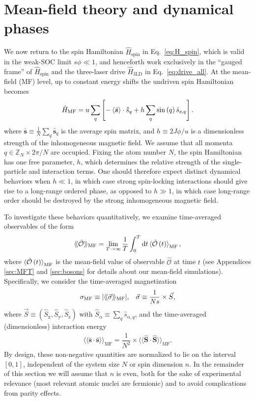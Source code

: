 \documentclass[aps,pra,nofootinbib,twocolumn,superscriptaddress]{revtex4-2}
\renewcommand{\t}{\text} %
\newcommand{\f}[2]{\dfrac{#1}{#2}} %
\newcommand{\p}[1]{\left(#1\right)} %
\renewcommand{\sp}[1]{\left[#1\right]} %
\newcommand{\bk}{\braket} %
\renewcommand{\v}{\bm} %
\renewcommand{\dd}{\text{d}} %
\newcommand{\bbk}[1]{\langle\!\langle #1 \rangle\!\rangle}
\newcommand{\1}{\mathds{1}}
\newcommand{\s}{\hat s}
\renewcommand{\H}{\hat H}
\renewcommand{\S}{\hat S}
\renewcommand{\O}{\hat{\mathcal{O}}}
\newcommand{\x}{\text{x}}
\newcommand{\y}{\text{y}}
\newcommand{\z}{\text{z}}
\newcommand{\ZZ}{\mathbb{Z}}
\newcommand{\spin}{\text{spin}}
\newcommand{\MF}{\text{MF}}
\renewcommand{\ss}{\bar{\v s}\cdot\bar{\v s}}
\begin{document}
\section{Mean-field theory and dynamical phases}
\label{sec:mean_field}

We now return to the spin Hamiltonian $\H_\spin$ in Eq.~\eqref{eq:H_spin}, which is valid in the weak-SOC limit $s\phi\ll1$, and henceforth work exclusively in the ``gauged frame'' of $\H_\spin$ and the three-laser drive $\H_{\t{3LD}}$ in Eq.~\eqref{eq:drive_all}.
At the mean-field (MF) level, up to constant energy shifts the undriven spin Hamiltonian becomes
\begin{align}
  \H_\MF = u \sum_q\sp{-\bk{\bar{\v s}}\cdot\v\s_q
    + h \sum_q \sin\p{q} \s_{\z,q}}.
  \label{eq:H_MF}
\end{align}
where $\bar{\v s}\equiv\frac1N\sum_q\v\s_q$ is the average spin matrix, and $h\equiv 2J\phi/u$ is a dimensionless strength of the inhomogeneous magnetic field.
We assume that all momenta $q\in\ZZ_N\times 2\pi/N$ are occupied.
Fixing the atom number $N$, the spin Hamiltonian has one free parameter, $h$, which determines the relative strength of the single-particle and interaction terms.
One should therefore expect distinct dynamical behaviors when $h\ll1$, in which case strong spin-locking interactions should give rise to a long-range ordered phase, as opposed to $h\gg1$, in which case long-range order should be destroyed by the strong inhomogeneous magnetic field.

To investigate these behaviors quantitatively, we examine time-averaged observables of the form
\begin{align}
  \bbk{\O}_\MF = \lim_{T\to\infty} \f1T \int_0^T \dd t \bk{\O\p{t}}_\MF,
\end{align}
where $\bk{\O\p{t}}_\MF$ is the mean-field value of observable $\O$ at time $t$ (see Appendices \ref{sec:MFT} and \ref{sec:bosons} for details about our mean-field simulations).
Specifically, we consider the time-averaged magnetization
\begin{align}
  \sigma_\MF \equiv \abs{\bbk{\vec\sigma}_\MF},
  &&
  \vec\sigma \equiv \f1{Ns} \times \vec S,
\end{align}
where $\vec S\equiv(\S_\x,\S_\y,\S_\z)$ with $\S_\alpha \equiv \sum_q \s_{\alpha,q}$, and the time-averaged (dimensionless) interaction energy
\begin{align}
  \bbk{\ss}_\MF = \f1{N^2} \times \bbk{\v\S\cdot\v\S}_\MF.
\end{align}
By design, these non-negative quantities are normalized to lie on the interval $[0,1]$, independent of the system size $N$ or spin dimension $n$.
In the remainder of this section we will assume that $n$ is even, both for the sake of experimental relevance (most relevant atomic nuclei are fermionic) and to avoid complications from parity effects.
\end{document}
